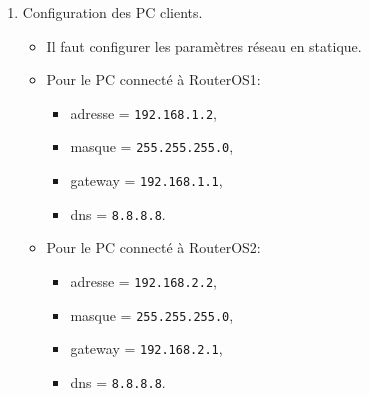 \documentclass[a4paper]{article}
\begin{document}
\begin{itemize}
\begin{enumerate}
    \item Configuration des PC clients.
    \begin{example}
        \begin{itemize}
            \item Il faut configurer les paramètres réseau en statique.
            \item Pour le PC connecté à RouterOS1:
            \begin{itemize}
                \item adresse = \texttt{192.168.1.2},
                \item masque = \texttt{255.255.255.0},
                \item gateway = \texttt{192.168.1.1},
                \item dns = \texttt{8.8.8.8}.
            \end{itemize}
            \item Pour le PC connecté à RouterOS2:
            \begin{itemize}
                \item adresse = \texttt{192.168.2.2},
                \item masque = \texttt{255.255.255.0},
                \item gateway = \texttt{192.168.2.1},
                \item dns = \texttt{8.8.8.8}.
            \end{itemize}
        \end{itemize}
    \end{example}



\end{enumerate}
\end{itemize}
\end{document}
